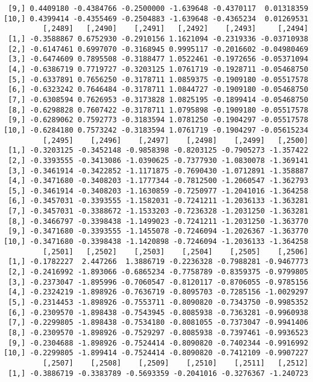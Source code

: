 \documentclass[
  letterpaper,
  DIV=11,
  numbers=noendperiod]{scrreprt}
\begin{document}
\begin{verbatim}
 [9,] 0.4409180 -0.4384766 -0.2500000 -1.639648 -0.4370117  0.01318359
[10,] 0.4399414 -0.4355469 -0.2504883 -1.639648 -0.4365234  0.01269531
         [,2489]   [,2490]    [,2491]   [,2492]    [,2493]     [,2494]
 [1,] -0.3588867 0.6752930 -0.2910156 1.1621094 -0.2319336 -0.03710938
 [2,] -0.6147461 0.6997070 -0.3168945 0.9995117 -0.2016602 -0.04980469
 [3,] -0.6474609 0.7895508 -0.3188477 1.0522461 -0.1972656 -0.05371094
 [4,] -0.6386719 0.7719727 -0.3203125 1.0761719 -0.1928711 -0.05468750
 [5,] -0.6337891 0.7656250 -0.3178711 1.0859375 -0.1909180 -0.05517578
 [6,] -0.6323242 0.7646484 -0.3178711 1.0844727 -0.1909180 -0.05468750
 [7,] -0.6308594 0.7626953 -0.3173828 1.0825195 -0.1899414 -0.05468750
 [8,] -0.6298828 0.7607422 -0.3178711 1.0795898 -0.1909180 -0.05517578
 [9,] -0.6289062 0.7592773 -0.3183594 1.0781250 -0.1904297 -0.05517578
[10,] -0.6284180 0.7573242 -0.3183594 1.0761719 -0.1904297 -0.05615234
         [,2495]    [,2496]    [,2497]    [,2498]    [,2499]   [,2500]
 [1,] -0.3203125 -0.3452148 -0.9858398 -0.8203125 -0.7905273 -1.357422
 [2,] -0.3393555 -0.3413086 -1.0390625 -0.7377930 -1.0830078 -1.369141
 [3,] -0.3461914 -0.3422852 -1.1171875 -0.7690430 -1.0712891 -1.358887
 [4,] -0.3471680 -0.3408203 -1.1777344 -0.7812500 -1.2060547 -1.362793
 [5,] -0.3461914 -0.3408203 -1.1630859 -0.7250977 -1.2041016 -1.364258
 [6,] -0.3457031 -0.3393555 -1.1582031 -0.7241211 -1.2036133 -1.363281
 [7,] -0.3457031 -0.3388672 -1.1533203 -0.7236328 -1.2031250 -1.363281
 [8,] -0.3466797 -0.3398438 -1.1499023 -0.7241211 -1.2031250 -1.363770
 [9,] -0.3471680 -0.3393555 -1.1455078 -0.7246094 -1.2026367 -1.363770
[10,] -0.3471680 -0.3398438 -1.1420898 -0.7246094 -1.2036133 -1.364258
         [,2501]   [,2502]    [,2503]    [,2504]    [,2505]    [,2506]
 [1,] -0.1782227  2.447266  1.3886719 -0.2236328 -0.7988281 -0.9467773
 [2,] -0.2416992 -1.893066 -0.6865234 -0.7758789 -0.8359375 -0.9799805
 [3,] -0.2373047 -1.895996 -0.7060547 -0.8120117 -0.8706055 -0.9785156
 [4,] -0.2324219 -1.898926 -0.7636719 -0.8095703 -0.7285156 -1.0029297
 [5,] -0.2314453 -1.898926 -0.7553711 -0.8090820 -0.7343750 -0.9985352
 [6,] -0.2309570 -1.898438 -0.7543945 -0.8085938 -0.7363281 -0.9960938
 [7,] -0.2299805 -1.898438 -0.7534180 -0.8081055 -0.7373047 -0.9941406
 [8,] -0.2309570 -1.898926 -0.7529297 -0.8085938 -0.7397461 -0.9936523
 [9,] -0.2304688 -1.898926 -0.7524414 -0.8090820 -0.7402344 -0.9916992
[10,] -0.2299805 -1.899414 -0.7524414 -0.8090820 -0.7412109 -0.9907227
         [,2507]    [,2508]    [,2509]    [,2510]    [,2511]   [,2512]
 [1,] -0.3886719 -0.3383789 -0.5693359 -0.2041016 -0.3276367 -1.240723

\end{verbatim}
\end{document}
